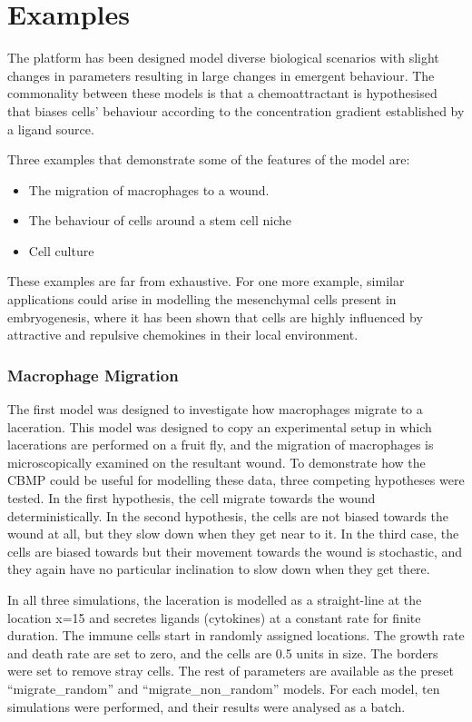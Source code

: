 \documentclass[12pt]{article}
\begin{document}
\section{Examples}
The platform has been designed model diverse biological scenarios with 
slight changes in parameters resulting in large changes in emergent 
behaviour. The commonality between these models is that a 
chemoattractant is hypothesised that biases cells' behaviour according 
to the concentration gradient established by a ligand source.

Three examples that demonstrate some of the features of the model are:

\begin{itemize}
\item The migration of macrophages to a wound.
\item The behaviour of cells around a stem cell niche
\item Cell culture
\end{itemize}

These examples are far from exhaustive. For one more example, similar 
applications could arise in modelling the mesenchymal cells present in 
embryogenesis,\cite{caplan91} where it has been shown that cells are highly influenced 
by attractive and repulsive chemokines in their local environment.

\subsubsection{Macrophage Migration}
The first model was designed to investigate how macrophages migrate to a 
laceration. This model was designed to copy an experimental setup in 
which lacerations are performed on a fruit fly, and the migration of 
macrophages is microscopically examined on the resultant wound. To 
demonstrate how the CBMP could be useful for modelling these data, three 
competing hypotheses were tested. In the first hypothesis, the cell 
migrate towards the wound deterministically. In the second hypothesis, 
the cells are not biased towards the wound at all, but they slow down 
when they get near to it. In the third case, the cells are biased 
towards but their movement towards the wound is stochastic, and they 
again have no particular inclination to slow down when they get there.

In all three simulations, the laceration is modelled as a straight-line 
at the location x=15 and secretes ligands (cytokines) at a constant rate 
for finite duration. The immune cells start in randomly assigned 
locations. The growth rate and death rate are set to zero, and the cells 
are 0.5 units in size. The borders were set to remove stray cells. The 
rest of parameters are available as the preset ``migrate\_random'' and 
``migrate\_non\_random'' models. For each model, ten simulations were 
performed, and their results were analysed as a batch.
\end{document}
